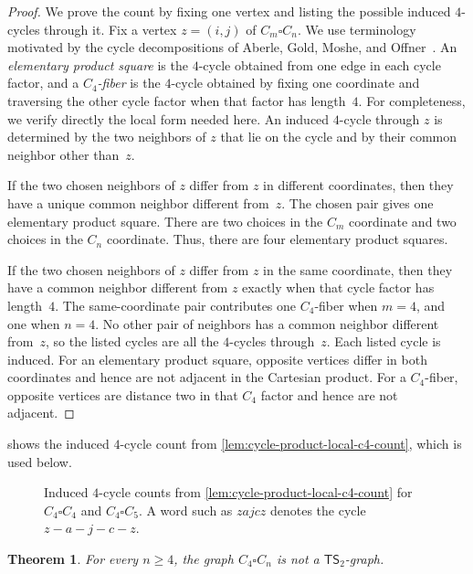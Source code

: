 \documentclass[a4paper]{article}
\theoremstyle{plain}
\newtheorem{theorem}{Theorem}[section]
\theoremstyle{definition}
\newcommand{\TSsym}{\mathsf{TS}}
\numberwithin{equation}{section}
\begin{document}
\begin{proof}
We prove the count by fixing one vertex and listing the possible induced $4$-cycles through it.
Fix a vertex $z=(i,j)$ of $C_m\square C_n$.
We use terminology motivated by the cycle decompositions of Aberle, Gold, Moshe, and Offner~\cite{AberleGMO2025}.
An \emph{elementary product square} is the $4$-cycle obtained from one edge in each cycle factor, and a \emph{$C_4$-fiber} is the $4$-cycle obtained by fixing one coordinate and traversing the other cycle factor when that factor has length~$4$.
For completeness, we verify directly the local form needed here.
An induced $4$-cycle through $z$ is determined by the two neighbors of $z$ that lie on the cycle and by their common neighbor other than~$z$.

If the two chosen neighbors of $z$ differ from $z$ in different coordinates, then they have a unique common neighbor different from~$z$.
The chosen pair gives one elementary product square.
There are two choices in the $C_m$ coordinate and two choices in the $C_n$ coordinate.
Thus, there are four elementary product squares.

If the two chosen neighbors of $z$ differ from $z$ in the same coordinate, then they have a common neighbor different from $z$ exactly when that cycle factor has length~$4$.
The same-coordinate pair contributes one $C_4$-fiber when $m=4$, and one when $n=4$.
No other pair of neighbors has a common neighbor different from~$z$, so the listed cycles are all the $4$-cycles through~$z$.
Each listed cycle is induced.
For an elementary product square, opposite vertices differ in both coordinates and hence are not adjacent in the Cartesian product.
For a $C_4$-fiber, opposite vertices are distance two in that $C_4$ factor and hence are not adjacent.
\end{proof}

 shows the induced $4$-cycle count from \cref{lem:cycle-product-local-c4-count}, which is used below.

\begin{figure}[ht]
\centering

\caption{Induced $4$-cycle counts from \cref{lem:cycle-product-local-c4-count} for $C_4\square C_4$ and $C_4\square C_5$. A word such as $zajcz$ denotes the cycle $z-a-j-c-z$.}
\label{fig:c4-product-obstruction}
\end{figure}

\begin{theorem}
\label{thm:c4-cycle-products-not-ts2}
For every $n\ge 4$, the graph $C_4\square C_n$ is not a $\TSsym_2$-graph.
\end{theorem}
\end{document}
